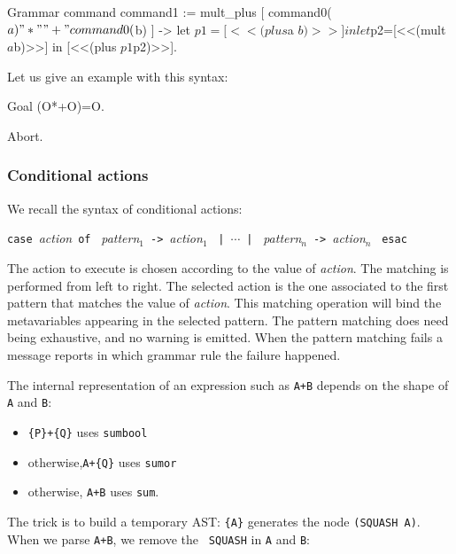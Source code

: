 \begin{coq_example}
Grammar command command1 := 
  mult_plus [ command0($a) "*" "+" command0($b) ]
     -> let $p1=[<<(plus $a $b)>>] in
        let $p2=[<<(mult $a $b)>>] in 
          [<<(plus $p1 $p2)>>].
\end{coq_example}

Let us give an example with this syntax:

\begin{coq_example}
Goal (O*+O)=O.
\end{coq_example}
\begin{coq_eval}
Abort.
\end{coq_eval}

\subsubsection{Conditional actions}

We recall the syntax of conditional actions:

\begin{center}
\texttt{case}~\textsl{action}~\texttt{of}~%
\textsl{pattern}$_1$~\verb+->+~\textsl{action}$_1$~%
\texttt{|}~$\cdots$~\texttt{|}~%
\textsl{pattern}$_n$~\verb+->+~\textsl{action}$_n$~%
\texttt{esac}
\end{center}

The action to execute is chosen according to the value of
\textsl{action}. The matching is performed from left to right. The
selected action is the one associated to the first pattern that
matches the value of \textsl{action}. This matching operation will
bind the metavariables appearing in the selected pattern. The pattern
matching does need being exhaustive, and no warning is emitted. When the
pattern matching fails a message reports in which grammar rule the
failure happened.


The internal representation of an expression such as {\tt A+B} depends
on the shape of {\tt A} and {\tt B}:
\begin{itemize}
\item \verb/{P}+{Q}/ uses {\tt sumbool}
\item otherwise,\verb/A+{Q}/ uses {\tt sumor}
\item otherwise, \verb/A+B/ uses {\tt sum}.
\end{itemize}
The trick is to build a temporary AST: \verb/{A}/ generates the node
\verb/(SQUASH A)/. When we parse \verb/A+B/, we remove the {\tt
SQUASH} in {\tt A} and {\tt B}:

